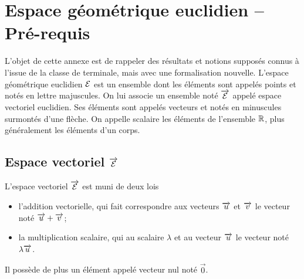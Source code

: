 \chapter{Espace géométrique euclidien -- Pré-requis}

L'objet de cette annexe est de rappeler des résultats et notions supposés connus à l'issue de la classe de terminale, mais avec une formalisation nouvelle. L'espace géométrique euclidien \(\mathcal{E}\) est un ensemble dont les éléments sont appelés points et notés en lettre majuscules. On lui associe un ensemble noté \(\overrightarrow{\mathcal{E}}\) appelé espace vectoriel euclidien. Ses éléments sont appelés vecteurs et notés en minuscules surmontés d'une flèche. On appelle scalaire les éléments de l'ensemble \(\mathbb{R}\), plus généralement les éléments d'un corps.

\section{Espace vectoriel \(\protect\overrightarrow{\mathcal{E}}\)}

L'espace vectoriel \(\overrightarrow{\mathcal{E}}\) est muni de deux lois
\begin{itemize}
\item l'addition vectorielle, qui fait correspondre aux vecteurs \(\overrightarrow{u}\) et \(\overrightarrow{v}\) le vecteur noté \(\overrightarrow{u} + \overrightarrow{v}\);
\item la multiplication scalaire, qui au scalaire \(\lambda\) et au vecteur \(\overrightarrow{u}\) le vecteur noté \(\lambda \overrightarrow{u}\).
\end{itemize}
 
Il possède de plus un élément appelé vecteur nul noté \(\vec{0}\).

